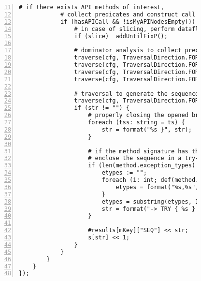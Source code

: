 \begin{figure}[ht!]
\begin{lstlisting}[numbers=left, tabsize=4, escapechar=@, caption={API Usage Mining Analysis},label={lst:aun-code}, firstline = 11, firstnumber = 11, lastline = 60]
            # if there exists API methods of interest, 
            # collect predicates and construct call sequences
		    if (hasAPICall && !isMyAPINodesEmpty()) {
		        # in case of slicing, perform dataflow slicing to capture dependencies
		        if (slice)  addUntilFixP();
		        
		        # dominator analysis to collect preconditions
		        traverse(cfg, TraversalDirection.FORWARD, TraversalKind.SHALLOW_ITERATIVE, allnode_ids);
			    traverse(cfg, TraversalDirection.FORWARD, TraversalKind.HYBRID, cfg_dom, fixp_dom);
			    traverse(cfg, TraversalDirection.FORWARD, TraversalKind.SHALLOW_ITERATIVE, dom_result);
			    traverse(cfg, TraversalDirection.FORWARD, TraversalKind.SHALLOW_ITERATIVE, dom_more);
                
                # traversal to generate the sequence
		        traverse(cfg, TraversalDirection.FORWARD, TraversalKind.SHALLOW_ITERATIVE, seqGen);
    			if (str != "") {
    			    # properly closing the opened braces in the sequence
    				foreach (tss: string = ts) {
    					str = format("%s }", str);
    				}
    				
    				# if the method signature has throws exceptions,
    				# enclose the sequence in a try-catch
    				if (len(method.exception_types) > 0) {
    				    etypes := "";
    				    foreach (i: int; def(method.exception_types[i])) {
    				        etypes = format("%s,%s", etypes, method.exception_types[i].name);
    				    }
    				    etypes = substring(etypes, 1);
    				    str = format("-> TRY { %s } CATCH(%s) {}", str, etypes);
    				}
    				    
    				#results[mKey]["SEQ"] << str; 
    				s[str] << 1; 
    			}
		    }
		}
	}
});
\end{lstlisting}
\end{figure}